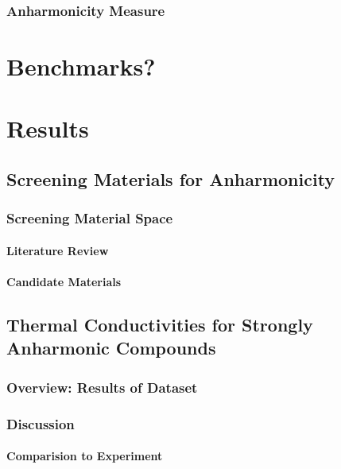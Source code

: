 \documentclass[nobib,a4paper,twoside,notoc,justified,marginals=justified]{tufte-book}
\begin{document}
\section{Anharmonicity Measure}

\part{Benchmarks?}

\part{Results}
\chapter{Screening Materials for Anharmonicity}
\section{Screening Material Space}
\subsection{Literature Review}
\subsection{Candidate Materials}

\chapter{Thermal Conductivities for Strongly Anharmonic Compounds}
\section{Overview: Results of Dataset}
\section{Discussion}
\subsection{Comparision to Experiment}
\end{document}

